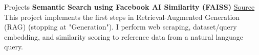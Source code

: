\begin{rubric}{Projects}
\entry*[2024] \textbf{Semantic Search using Facebook AI Similarity (FAISS)} \hfill \href{https://github.com/NathanCorral/Hugging-Face-FAISS-Semantic-Search}{\faGithub Source} \newline
\qquad This project implements the first steps in Retrieval-Augmented Generation (RAG) (stopping at "Generation").  I perform web scraping, dataset/query embedding, and similarity scoring to reference data from a natural language query.  


\begin{comment}
\entry*[2021] \textbf{Temporal Convolutional Network} \newline
As part of a class project, we re-implemented the Multi-Stage Temporal Convolutional Network\footnote{Y. Abu Farha et al., "MS-TCN: Multi-Stage Temporal Convolutional Network for Action Segmentation." CVPR 2019.} in PyTorch.  This project achieved: \newline
\vspace{\CVItemizeHeaderSpacing} \begin{itemize}
	\setlength{\itemsep}{\CVItemizeSpacing}
	\item Understanding state-of-the-art (2019) computer vision networks on video action classification.
	\item Training and testing the model on a subset of an actively used dataset ($\approx$30\% of the Breakfast Actions Dataset).
	\item Verifying results reported in the paper (66\% accuracy).
\end{itemize}


\entry*[2016] \textbf{Tower of Hanoi} \newline
I programmed a robot arm to play the Tower of Hanoi game with full automation.  The project goals consisted of:  \newline
\vspace{\CVItemizeHeaderSpacing} \begin{itemize}
	\setlength{\itemsep}{\CVItemizeSpacing}
	\item Calculating the Inverse Kinematics for a ROS Controlled Rhino RX2 arm, and programming them in C++.
	\item Attaching a down-facing camera and building a computer vision node to identify blocks in the robot plane.
	\item Establishing tower centers and programming the Tower of Hanoi game logic.
\end{itemize}


\end{comment}
\end{rubric}
